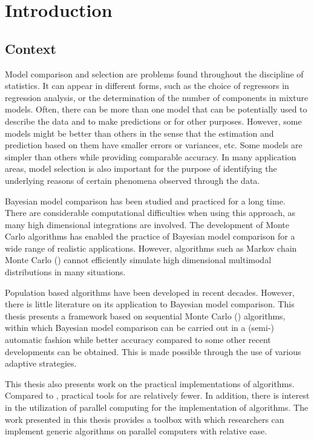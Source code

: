 \chapter{Introduction}
\label{cha:Introduction}

\section{Context}
\label{sec:Context}

Model comparison and selection are problems found throughout the discipline
of statistics. It can appear in different forms, such as the choice of
regressors in regression analysis, or the determination of the number of
components in mixture models. Often, there can be more than one model that
can be potentially used to describe the data and to make predictions or for
other purposes. However, some models might be better than others in the sense
that the estimation and prediction based on them have smaller errors or
variances, etc. Some models are simpler than others while providing
comparable accuracy. In many application areas, model selection is also
important for the purpose of identifying the underlying reasons of certain
phenomena observed through the data.

Bayesian model comparison has been studied and practiced for a long time.
There are considerable computational difficulties when using this approach,
as many high dimensional integrations are involved. The development of Monte
Carlo algorithms has enabled the practice of Bayesian model comparison for a
wide range of realistic applications. However, algorithms such as Markov
chain Monte Carlo (\mcmc) cannot efficiently simulate high dimensional
multimodal distributions in many situations.

Population based algorithms have been developed in recent decades. However,
there is little literature on its application to Bayesian model comparison.
This thesis presents a framework based on sequential Monte Carlo (\smc)
algorithms, within which Bayesian model comparison can be carried out in a
(semi-) automatic fashion while better accuracy compared to some other recent
developments can be obtained. This is made possible through the use of
various adaptive strategies.

This thesis also presents work on the practical implementations of \smc
algorithms. Compared to \mcmc, practical tools for \smc are relatively fewer.
In addition, there is interest in the utilization of parallel computing for
the implementation of \smc algorithms. The work presented in this thesis
provides a toolbox with which researchers can implement generic \smc
algorithms on parallel computers with relative ease.

